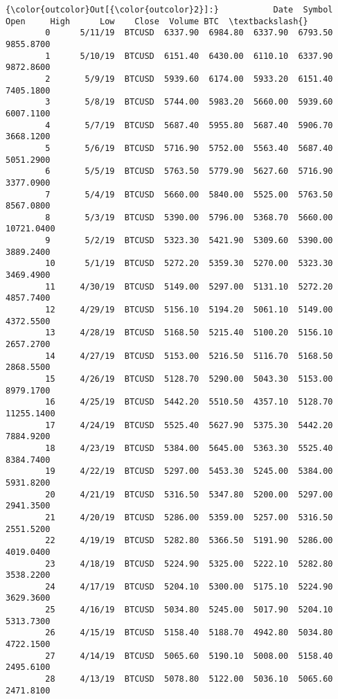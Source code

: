 \documentclass[11pt]{article}
\begin{document}
\begin{Verbatim}[commandchars=\\\{\}]
{\color{outcolor}Out[{\color{outcolor}2}]:}           Date  Symbol     Open     High      Low    Close  Volume BTC  \textbackslash{}
        0      5/11/19  BTCUSD  6337.90  6984.80  6337.90  6793.50   9855.8700   
        1      5/10/19  BTCUSD  6151.40  6430.00  6110.10  6337.90   9872.8600   
        2       5/9/19  BTCUSD  5939.60  6174.00  5933.20  6151.40   7405.1800   
        3       5/8/19  BTCUSD  5744.00  5983.20  5660.00  5939.60   6007.1100   
        4       5/7/19  BTCUSD  5687.40  5955.80  5687.40  5906.70   3668.1200   
        5       5/6/19  BTCUSD  5716.90  5752.00  5563.40  5687.40   5051.2900   
        6       5/5/19  BTCUSD  5763.50  5779.90  5627.60  5716.90   3377.0900   
        7       5/4/19  BTCUSD  5660.00  5840.00  5525.00  5763.50   8567.0800   
        8       5/3/19  BTCUSD  5390.00  5796.00  5368.70  5660.00  10721.0400   
        9       5/2/19  BTCUSD  5323.30  5421.90  5309.60  5390.00   3889.2400   
        10      5/1/19  BTCUSD  5272.20  5359.30  5270.00  5323.30   3469.4900   
        11     4/30/19  BTCUSD  5149.00  5297.00  5131.10  5272.20   4857.7400   
        12     4/29/19  BTCUSD  5156.10  5194.20  5061.10  5149.00   4372.5500   
        13     4/28/19  BTCUSD  5168.50  5215.40  5100.20  5156.10   2657.2700   
        14     4/27/19  BTCUSD  5153.00  5216.50  5116.70  5168.50   2868.5500   
        15     4/26/19  BTCUSD  5128.70  5290.00  5043.30  5153.00   8979.1700   
        16     4/25/19  BTCUSD  5442.20  5510.50  4357.10  5128.70  11255.1400   
        17     4/24/19  BTCUSD  5525.40  5627.90  5375.30  5442.20   7884.9200   
        18     4/23/19  BTCUSD  5384.00  5645.00  5363.30  5525.40   8384.7400   
        19     4/22/19  BTCUSD  5297.00  5453.30  5245.00  5384.00   5931.8200   
        20     4/21/19  BTCUSD  5316.50  5347.80  5200.00  5297.00   2941.3500   
        21     4/20/19  BTCUSD  5286.00  5359.00  5257.00  5316.50   2551.5200   
        22     4/19/19  BTCUSD  5282.80  5366.50  5191.90  5286.00   4019.0400   
        23     4/18/19  BTCUSD  5224.90  5325.00  5222.10  5282.80   3538.2200   
        24     4/17/19  BTCUSD  5204.10  5300.00  5175.10  5224.90   3629.3600   
        25     4/16/19  BTCUSD  5034.80  5245.00  5017.90  5204.10   5313.7300   
        26     4/15/19  BTCUSD  5158.40  5188.70  4942.80  5034.80   4722.1500   
        27     4/14/19  BTCUSD  5065.60  5190.10  5008.00  5158.40   2495.6100   
        28     4/13/19  BTCUSD  5078.80  5122.00  5036.10  5065.60   2471.8100   

\end{Verbatim}
\end{document}
